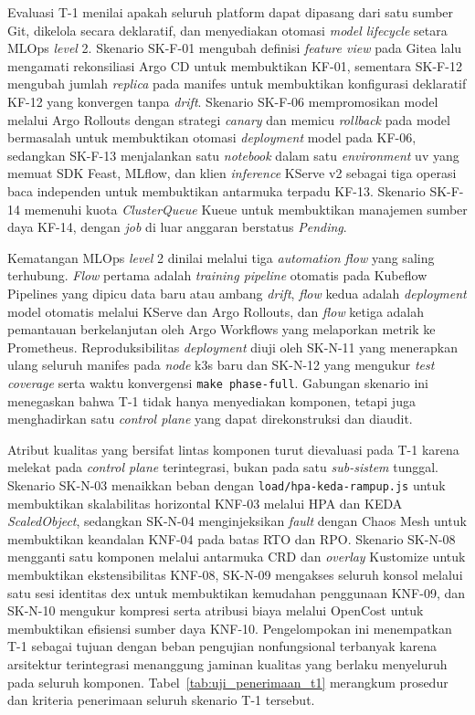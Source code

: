 Evaluasi T-1 menilai apakah seluruh platform dapat dipasang dari satu sumber Git, dikelola secara deklaratif, dan menyediakan otomasi \textit{model lifecycle} setara MLOps \textit{level} 2. Skenario SK-F-01 mengubah definisi \textit{feature view} pada Gitea lalu mengamati rekonsiliasi Argo CD untuk membuktikan KF-01, sementara SK-F-12 mengubah jumlah \textit{replica} pada manifes untuk membuktikan konfigurasi deklaratif KF-12 yang konvergen tanpa \textit{drift}. Skenario SK-F-06 mempromosikan model melalui Argo Rollouts dengan strategi \textit{canary} dan memicu \textit{rollback} pada model bermasalah untuk membuktikan otomasi \textit{deployment} model pada KF-06, sedangkan SK-F-13 menjalankan satu \textit{notebook} dalam satu \textit{environment} uv yang memuat SDK Feast, MLflow, dan klien \textit{inference} KServe v2 sebagai tiga operasi baca independen untuk membuktikan antarmuka terpadu KF-13. Skenario SK-F-14 memenuhi kuota \textit{ClusterQueue} Kueue untuk membuktikan manajemen sumber daya KF-14, dengan \textit{job} di luar anggaran berstatus \textit{Pending}.

Kematangan MLOps \textit{level} 2 dinilai melalui tiga \textit{automation flow} yang saling terhubung. \textit{Flow} pertama adalah \textit{training pipeline} otomatis pada Kubeflow Pipelines yang dipicu data baru atau ambang \textit{drift}, \textit{flow} kedua adalah \textit{deployment} model otomatis melalui KServe dan Argo Rollouts, dan \textit{flow} ketiga adalah pemantauan berkelanjutan oleh Argo Workflows yang melaporkan metrik ke Prometheus. Reproduksibilitas \textit{deployment} diuji oleh SK-N-11 yang menerapkan ulang seluruh manifes pada \textit{node} k3s baru dan SK-N-12 yang mengukur \textit{test coverage} serta waktu konvergensi \texttt{make phase-full}. Gabungan skenario ini menegaskan bahwa T-1 tidak hanya menyediakan komponen, tetapi juga menghadirkan satu \textit{control plane} yang dapat direkonstruksi dan diaudit.

Atribut kualitas yang bersifat lintas komponen turut dievaluasi pada T-1 karena melekat pada \textit{control plane} terintegrasi, bukan pada satu \textit{sub-sistem} tunggal. Skenario SK-N-03 menaikkan beban dengan \texttt{load/hpa-keda-rampup.js} untuk membuktikan skalabilitas horizontal KNF-03 melalui HPA dan KEDA \textit{ScaledObject}, sedangkan SK-N-04 menginjeksikan \textit{fault} dengan Chaos Mesh untuk membuktikan keandalan KNF-04 pada batas RTO dan RPO. Skenario SK-N-08 mengganti satu komponen melalui antarmuka CRD dan \textit{overlay} Kustomize untuk membuktikan ekstensibilitas KNF-08, SK-N-09 mengakses seluruh konsol melalui satu sesi identitas dex untuk membuktikan kemudahan penggunaan KNF-09, dan SK-N-10 mengukur kompresi serta atribusi biaya melalui OpenCost untuk membuktikan efisiensi sumber daya KNF-10. Pengelompokan ini menempatkan T-1 sebagai tujuan dengan beban pengujian nonfungsional terbanyak karena arsitektur terintegrasi menanggung jaminan kualitas yang berlaku menyeluruh pada seluruh komponen. Tabel~\ref{tab:uji_penerimaan_t1} merangkum prosedur dan kriteria penerimaan seluruh skenario T-1 tersebut.

